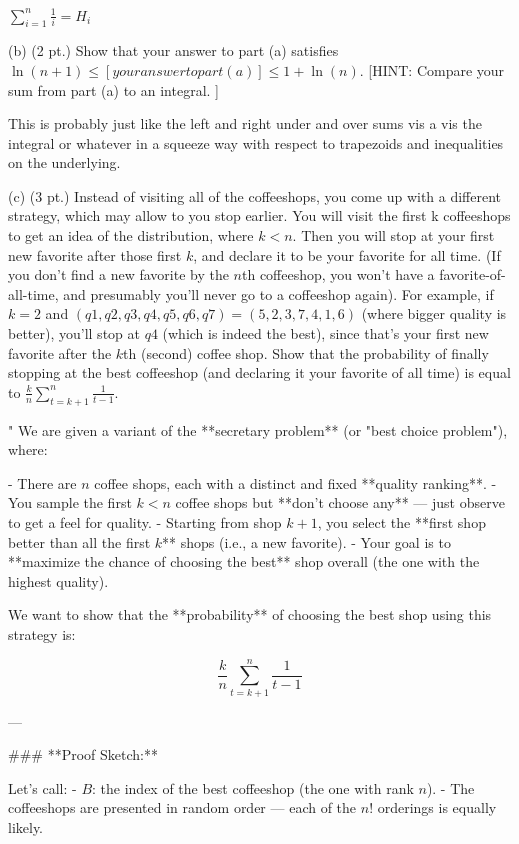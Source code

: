 $\sum_{i=1}^n \frac{1}{i} = H_i$

(b) (2 pt.) Show that your answer to part (a) satisfies $\ln(n + 1) ≤ [your answer to part (a)] ≤ 1 + \ln(n)$. [HINT: Compare your sum from part (a) to an integral. ]

This is probably just like the left and right under and over sums vis a vis the integral or whatever in a squeeze way with respect to trapezoids and inequalities on the underlying.

(c) (3 pt.) Instead of visiting all of the coffeeshops, you come up with a different strategy, which may allow to you stop earlier. You will visit the first k coffeeshops to get an idea of the distribution, where $k < n$. Then you will stop at your first new favorite after those first $k$, and declare it to be your favorite for all time. (If you don't find a new favorite by the $n$th coffeeshop, you won't have a favorite-of-all-time, and presumably you'll never go to a coffeeshop again). For example, if $k = 2$ and $(q1, q2, q3, q4, q5, q6, q7) = (5, 2, 3, 7, 4, 1, 6)$ (where bigger quality is better), you'll stop at $q4$ (which is indeed the best), since that's your first new favorite after the $k$th (second) coffee shop. Show that the probability of finally stopping at the best coffeeshop (and declaring it your favorite of all time) is equal to $\frac{k}{n} \sum_{t=k+1}^n \frac{1}{t - 1}$.

"
We are given a variant of the **secretary problem** (or "best choice problem"), where:

- There are \( n \) coffee shops, each with a distinct and fixed **quality ranking**.
- You sample the first \( k < n \) coffee shops but **don't choose any** — just observe to get a feel for quality.
- Starting from shop \( k+1 \), you select the **first shop better than all the first \( k \)** shops (i.e., a new favorite).
- Your goal is to **maximize the chance of choosing the best** shop overall (the one with the highest quality).
  
We want to show that the **probability** of choosing the best shop using this strategy is:

\[
\frac{k}{n} \sum_{t = k+1}^n \frac{1}{t - 1}
\]

---

### **Proof Sketch:**

Let's call:
- \( B \): the index of the best coffeeshop (the one with rank \( n \)).
- The coffeeshops are presented in random order — each of the \( n! \) orderings is equally likely.

